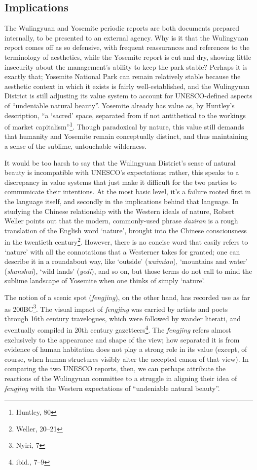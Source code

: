 \subsection*{Implications}

The Wulingyuan and Yosemite periodic reports are both documents prepared
internally, to be presented to an external agency. Why is it that the Wulingyuan
report comes off as so defensive, with frequent reassurances and references to
the terminology of aesthetics, while the Yosemite report is cut and dry, showing
little insecurity about the management's ability to keep the park stable?
Perhaps it is exactly that; Yosemite National Park can remain relatively stable
because the aesthetic context in which it exists is fairly well-established, and
the Wulingyuan District is still adjusting its value system to account for
UNESCO-defined aspects of ``undeniable natural beauty''.  Yosemite already has
value as, by Huntley's description, ``a `sacred' space, separated from if not
antithetical to the workings of market capitalism''\footnote{Huntley, 80}.
Though paradoxical by nature, this value still demands that humanity and
Yosemite remain conceptually distinct, and thus maintaining a sense of the
sublime, untouchable wilderness.

It would be too harsh to say that the Wulingyuan District's sense of natural
beauty is incompatible with UNESCO's expectations; rather, this speaks to a
discrepancy in value systems that just make it difficult for the two parties to
communicate their intentions. At the most basic level, it's a failure rooted
first in the language itself, and secondly in the implications behind that
language. In studying the Chinese relationship with the Western ideals of
nature, Robert Weller points out that the modern, commonly-used phrase
\textit{daziran} is a rough translation of the English word `nature', brought
into the Chinese consciousness in the twentieth century\footnote{Weller,
20--21}. However, there is no concise word that easily refers to `nature' with
all the connotations that a Westerner takes for granted; one can describe it in
a roundabout way, like `outside' (\textit{waimian}), `mountains and water'
(\textit{shanshui}), `wild lands' (\textit{yedi}), and so on, but those terms do
not call to mind the sublime landscape of Yosemite when one thinks of simply
`nature'.

The notion of a scenic spot (\textit{fengjing}), on the other hand, has recorded
use as far as 200BC\footnote{Nyiri, 7}. The visual impact of \textit{fengjing}
was carried by artists and poets through 16th century travelogues, which were
followed by wander literati, and eventually compiled in 20th century
gazetteers\footnote{ibid., 7--9}. The \textit{fengjing} refers almost
exclusively to the appearance and shape of the view; how separated it is from
evidence of human habitation does not play a strong role in its value (except,
of course, when human structures visibly alter the accepted canon of that view).
In comparing the two UNESCO reports, then, we can perhaps attribute the
reactions of the Wulingyuan committee to a struggle in aligning their idea of
\textit{fengjing} with the Western expectations of ``undeniable natural
beauty''.

